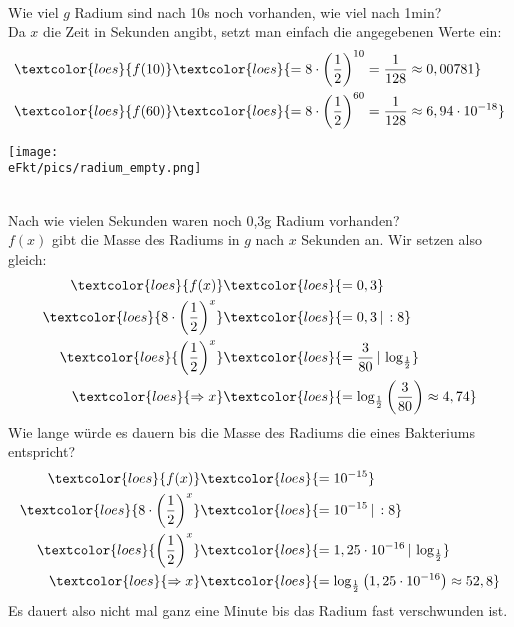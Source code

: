\begin{minipage}{0.39\textwidth}
	\vspace{0.3cm}\\
	Wie viel \(g\) Radium sind nach 10s noch vorhanden, wie viel nach 1min?\\
	\textcolor{loes}{Da \(x\) die Zeit in Sekunden angibt, setzt man einfach die angegebenen Werte ein:}
	\begin{align*}
		\textcolor{loes}{f(10)}&\textcolor{loes}{=8\cdot \left(\frac{1}{2}\right)^{10}=\frac{1}{128}\approx 0,00781}\\
		\textcolor{loes}{f(60)}&\textcolor{loes}{=8\cdot \left(\frac{1}{2}\right)^{60}=\frac{1}{128}\approx 6,94\cdot10^{-18}}
	\end{align*}
	\vfill
\end{minipage}
\begin{minipage}{0.6\textwidth}\centering
	\texttt{[image: \\eFkt/pics/radium\_empty.png]}
\end{minipage}\vspace{0.3cm}\\
Nach wie vielen Sekunden waren noch 0,3g Radium vorhanden?\\
\textcolor{loes}{\(f(x)\) gibt die Masse des Radiums in \(g\) nach \(x\) Sekunden an. Wir setzen also gleich:}
\begin{align*}
	\textcolor{loes}{f(x)}&\textcolor{loes}{=0,3}\\
	\textcolor{loes}{8\cdot \left(\frac{1}{2}\right)^x}&\textcolor{loes}{=0,3\,\vert\,:8}\\
	\textcolor{loes}{\left(\frac{1}{2}\right)^x}&\textcolor{loes}{=\frac{3}{80}\,\vert\,\log_{\frac{1}{2}}}\\
	\textcolor{loes}{\Rightarrow x}&\textcolor{loes}{=\log_{\frac{1}{2}}\left(\frac{3}{80}\right) \approx 4,74}
\end{align*}
Wie lange würde es dauern bis die Masse des Radiums die eines Bakteriums entspricht?
\begin{align*}
	\textcolor{loes}{f(x)}&\textcolor{loes}{=10^{-15}}\\
	\textcolor{loes}{8\cdot \left(\frac{1}{2}\right)^x}&\textcolor{loes}{=10^{-15}\,\vert\,:8}\\
	\textcolor{loes}{\left(\frac{1}{2}\right)^x}&\textcolor{loes}{=1,25\cdot 10^{-16}\,\vert\,\log_{\frac{1}{2}}}\\
	\textcolor{loes}{\Rightarrow x}&\textcolor{loes}{=\log_{\frac{1}{2}}\left(1,25\cdot 10^{-16}\right) \approx 52,8}
\end{align*}
\textcolor{loes}{Es dauert also nicht mal ganz eine Minute bis das Radium fast verschwunden ist.}